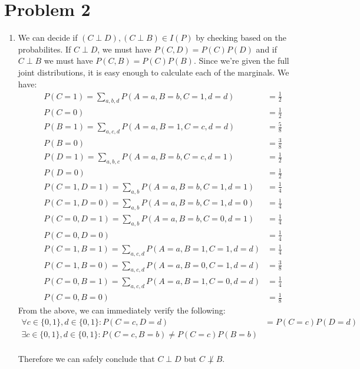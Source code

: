 \documentclass[12pt]{article}
\begin{document}
\pagebreak
\section*{Problem 2}

\begin{enumerate}[label=(\alph*)]
\item We can decide if $(C \perp D), (C \perp B) \in I(P)$ by checking based on the probabilites. If $C \perp D$, we must have $P(C,D) = P(C)P(D)$ and if $C \perp B$ we must have $P(C,B) = P(C)P(B)$. Since we're given the full joint distributions, it is easy enough to calculate each of the marginals. We have:
\begin{align*}
&P(C = 1) = \sum_{a,b,d} P(A = a, B=b, C=1, d=d) &= \frac{1}{2}\\
&P(C = 0) &= \frac{1}{2} \\
&P(B = 1) =\sum_{a,c,d} P(A = a, B=1, C=c, d=d) &= \frac{5}{8} \\
&P(B = 0) &= \frac{3}{8} \\
&P(D = 1) =\sum_{a,b,c} P(A = a, B=b, C=c, d=1)&= \frac{1}{2} \\ 
&P(D = 0) &= \frac{1}{2} \\ 
&P(C = 1, D = 1) = \sum_{a,b} P(A = a, B=b, C=1, d=1) &= \frac{1}{4} \\
&P(C = 1, D = 0) = \sum_{a,b} P(A = a, B=b, C=1, d=0) &= \frac{1}{4} \\
&P(C = 0, D = 1) = \sum_{a,b} P(A = a, B=b, C=0, d=1) &= \frac{1}{4} \\
&P(C = 0, D = 0) &= \frac{1}{4} \\
&P(C = 1, B = 1) =\sum_{a,c,d} P(A = a, B=1, C=1, d=d) &= \frac{1}{4} \\
&P(C = 1, B = 0) =\sum_{a,c,d} P(A = a, B=0, C=1, d=d) &= \frac{3}{8} \\
&P(C = 0, B = 1) =\sum_{a,c,d} P(A = a, B=1, C=0, d=d) &= \frac{1}{4} \\
&P(C = 0, B = 0) &= \frac{1}{8} 
\end{align*}
From the above, we can immediately verify the following:
\begin{align*}
\forall c \in \{0,1\},d \in \{0,1\}: P(C =c, D=d) &= P(C=c)P(D=d) \\
\exists c \in \{0,1\},d \in \{0,1\}: P(C = c, B =b) \neq P(C = c) P(B = b) \\
\end{align*}

Therefore we can safely conclude that $C \perp D$ but $C \not\perp B$.


\end{enumerate}
\end{document}
